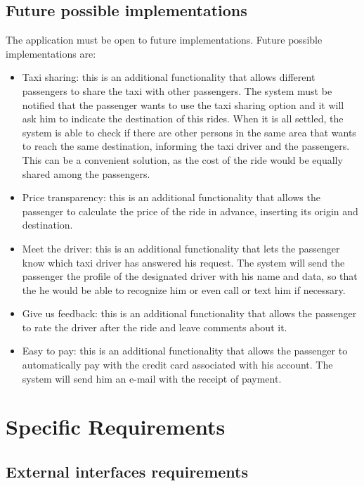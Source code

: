 \documentclass[18pt,oneside,a4paper, titlepage]{article}
\begin{document}
		\subsection{Future possible implementations}
			The application must be open to future implementations. 
			Future possible implementations are:
			\begin{itemize}
				\item Taxi sharing: this is an additional functionality that allows different passengers to share the taxi with other passengers. The system must be notified that the passenger wants to use the taxi sharing option and it will ask him to indicate the destination of this rides. When it is all settled, the system is able to check if there are other persons in the same area that wants to reach the same destination, informing the taxi driver and the passengers. This can be a convenient solution, as the cost of the ride would be equally shared among the passengers.
				\item Price transparency: this is an additional functionality that allows the passenger to calculate the price of the ride in advance, inserting its origin and destination.
				\item Meet the driver: this is an additional functionality that lets the passenger know which taxi driver has answered his request. The system will send the passenger the profile of the designated driver with his name and data, so that the he would be able to recognize him or even call or text him if necessary.
				\item Give us feedback: this is an additional functionality that allows the passenger to rate the driver after the ride and leave comments about it.
				\item Easy to pay: this is an additional functionality that allows the passenger to automatically pay with the credit card associated with his account. The system will send him an e-mail with the receipt of payment.
			\end{itemize}

\newpage
\section{Specific Requirements}
	\subsection{External interfaces requirements}
\end{document}

